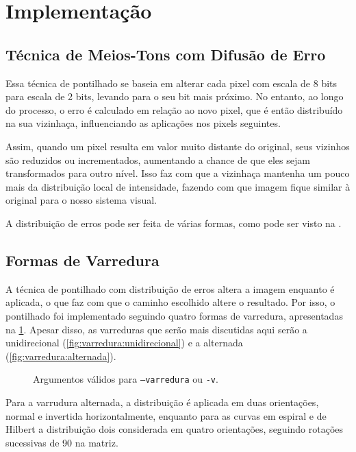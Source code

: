 \section{Implementação} \label{sec:impl}

\subsection{Técnica de Meios-Tons com Difusão de Erro}

    Essa técnica de pontilhado se baseia em alterar cada pixel com escala de 8 bits para escala de 2 bits, levando para o seu bit mais próximo. No entanto, ao longo do processo, o erro é calculado em relação ao novo pixel, que é então distribuído na sua vizinhaça, influenciando as aplicações nos pixels seguintes.

    Assim, quando um pixel resulta em valor muito distante do original, seus vizinhos são reduzidos ou incrementados, aumentando a chance de que eles sejam transformados para outro nível. Isso faz com que a vizinhaça mantenha um pouco mais da distribuição local de intensidade, fazendo com que imagem fique similar à original para o nosso sistema visual.

    A distribuição de erros pode ser feita de várias formas, como pode ser visto na .

\subsection{Formas de Varredura} \label{sec:varredura}

    A técnica de pontilhado com distribuição de erros altera a imagem enquanto é aplicada, o que faz com que o caminho escolhido altere o resultado. Por isso, o pontilhado foi implementado seguindo quatro formas de varredura, apresentadas na \cref{fig:varredura}. Apesar disso, as varreduras que serão mais discutidas aqui serão a unidirecional (\ref{fig:varredura:unidirecional}) e a alternada (\ref{fig:varredura:alternada}).

    \begin{figure}[H]
        \centering
        

        \caption{Argumentos válidos para \texttt{--varredura} ou \texttt{-v}.}
        \label{fig:varredura}
    \end{figure}

    Para a varrudura alternada, a distribuição é aplicada em duas orientações, normal e invertida horizontalmente, enquanto para as curvas em espiral e de Hilbert a distribuição dois considerada em quatro orientações, seguindo rotações sucessivas de 90\textdegree{} na matriz.

